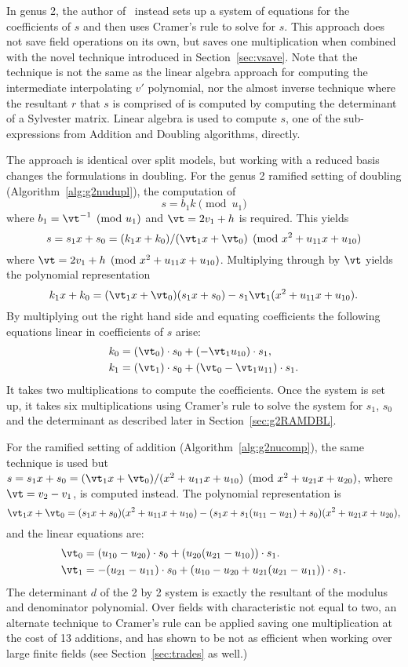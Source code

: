 In genus 2, the author of~\cite{Balamohan_MSc_2009} instead sets up a system of
equations for the coefficients of $s$ and then uses Cramer's rule to solve for
$s$. This approach does not save field operations on its own, but saves one
multiplication when combined with the novel technique introduced in
Section~\ref{sec:vsave}. Note that the
technique is not the same as the linear algebra approach for computing the
intermediate interpolating $v'$ polynomial, nor the almost inverse technique
where the resultant $r$ that $s$ is comprised of is computed by computing the
determinant of a Sylvester matrix. Linear algebra is used to compute $s$, one of
the sub-expressions from Addition and Doubling algorithms, directly.

The approach is identical over split models, but working with a reduced basis
changes the formulations in doubling. For the genus 2 ramified setting of doubling
(Algorithm~\ref{alg:g2nudupl}), the computation of $$s = b_1k \pmod{u_1}$$ where
$b_1 = \vt^{-1} \pmod{u_1}$ and $\vt = 2v_1 + h$ is required. This yields $$s =
s_1x + s_0 = (k_1x + k_0)/(\vt_1x + \vt_0) \pmod{x^2 + u_{11}x + u_{10}}$$ where
$\vt = 2v_1 + h \pmod{x^2 + u_{11}x + u_{10}}$. Multiplying through by $\vt$
yields the polynomial representation $$ k_1x + k_0 = (\vt_1x + \vt_0)(s_1x +
s_0) - s_1\vt_1(x^2 + u_{11}x + u_{10}).$$ By multiplying out the right hand
side and equating coefficients the following equations linear in coefficients of
$s$ arise:  
\begin{align*} k_0 &=
(\vt_0) \cdot s_0 + (-\vt_1u_{10}) \cdot s_1, \\
k_1 &= (\vt_1) \cdot s_0 + (\vt_0 - \vt_1u_{11}) \cdot s_1.
\end{align*} 
It takes two multiplications to compute the coefficients. Once the system is set
up, it takes six multiplications using Cramer's rule to solve the system for
$s_1$, $s_0$ and the determinant as described later in Section~\ref{sec:g2RAMDBL}.

For the ramified setting of addition (Algorithm~\ref{alg:g2nucomp}), the same technique
is used but $s = s_1x + s_0 = (\vt_1x + \vt_0)/(x^2 + u_{11}x + u_{10})
\pmod{x^2 + u_{21}x + u_{20}}$, where $\vt = v_2 - v_1$,  is computed instead.
The polynomial representation is
$$\vt_1x + \vt_0 = (s_1x + s_0)(x^2 + u_{11}x + u_{10}) - (s_1x + s_1(u_{11}
-u_{21}) + s_0)(x^2 + u_{21}x + u_{20}),$$ and the linear equations are:
\begin{align*} 
    \vt_0 &= (u_{10} - u_{20}) \cdot s_0 + (u_{20}(u_{21} - u_{10})) \cdot s_1.\\
    \vt_1 &= -(u_{21}- u_{11}) \cdot s_0 + (u_{10} - u_{20} + u_{21}(u_{21}-u_{11})) \cdot s_1. \\
\end{align*}
The determinant $d$ of the 2 by 2 system is exactly the resultant of the modulus
and denominator polynomial.  Over fields with characteristic not equal to two,
an alternate technique to Cramer's rule can be applied saving one multiplication
at the cost of 13 additions, and has shown to be not as efficient when working
over large finite fields \cite{BosCostelloHisilLauter_fastg2_2013} (see
Section~\ref{sec:trades} as well.)

